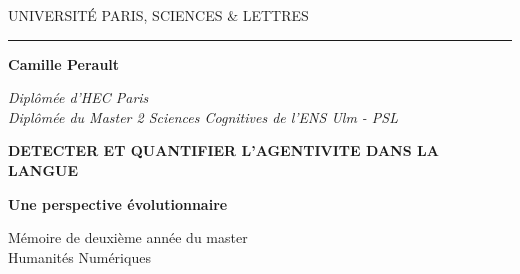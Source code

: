 \begin{titlepage}
\begin{center}

\bigskip

\begin{large}
UNIVERSITÉ PARIS, SCIENCES \& LETTRES
\end{large}

\begin{center}\rule{2cm}{0.02cm}\end{center}

\bigskip
\bigskip
\bigskip
\begin{Large}
\textbf{Camille Perault}\\
\end{Large}
\begin{normalsize}
\textit{Diplômée d'HEC Paris}\\
\textit{Diplômée du Master 2 Sciences Cognitives de l'ENS Ulm - PSL}\\
\end{normalsize}

\bigskip
\bigskip
\bigskip

\begin{Huge}
\textbf{DETECTER ET QUANTIFIER L’AGENTIVITE DANS LA LANGUE}\\
\end{Huge}

\bigskip
\bigskip
\begin{LARGE}
\textbf{Une perspective évolutionnaire}\\
\end{LARGE}

\bigskip
\bigskip
\bigskip
\vfill

\begin{large}
Mémoire de deuxième année du master\\
\og Humanités Numériques \fg{} \\
\end{large}

\end{center}
\end{titlepage}
